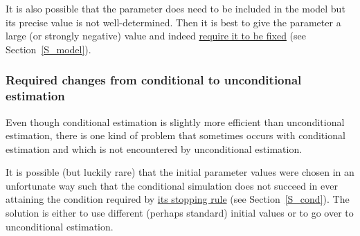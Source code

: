 \documentclass[a4paper,fleqn,11pt]{article}
\newcommand{\+}{\, + \,}
\begin{document}
It is also possible that the parameter does need to be included in
the model but its precise value is not well-determined. Then it is
best to give the parameter a large (or strongly negative) value
and indeed
\hyperlink{T_fix}{require it to be fixed}
(see Section~\ref{S_model}).


\subsubsection{Required changes from conditional to unconditional estimation}

Even though conditional estimation is slightly more efficient than
unconditional estimation, there is one kind of problem that
sometimes occurs with conditional estimation and which is not
encountered by unconditional estimation.

It is possible (but luckily rare) that the initial parameter
values were chosen in an unfortunate way such that the conditional
simulation does not succeed in ever attaining the condition required
by \hyperlink{T_distance_stop}{its stopping rule} (see
Section~\ref{S_cond}).
The solution is either to use different
(perhaps standard) initial values or to go over to
unconditional estimation.
\end{document}
